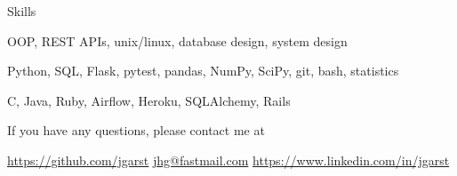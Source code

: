 \documentclass[11pt,a4paper]{article}
\begin{document}
\begin{mysection}{Skills}

    \begin{addmargin}[0.5em]{0em}

    \phantom{\large\bfseries Software Fundamentals: \quad}
     OOP, REST APIs, unix/linux, database design, system design
    \end{addmargin}

    \begin{addmargin}[0.5em]{0em}
        \phantom{\large\bfseries Software Fundamentals: \quad}
        Python, SQL, Flask, pytest, pandas, NumPy, SciPy, git, bash, statistics

    \end{addmargin}

    \begin{addmargin}[0.5em]{0em}

    \phantom{\large\bfseries Software Fundamentals: \quad}
    C, Java, Ruby, Airflow, Heroku, SQLAlchemy, Rails
    \end{addmargin}

\end{mysection}

\vfill

\begin{center}
    If you have any questions, please contact me at
\end{center}

\begin{center}
    \href{https://github.com/jgarst}{https://github.com/jgarst} 
    \textbullet{} 
    \href{jhg@fastmail.com}{jhg@fastmail.com}
    \textbullet{} 
    \href{https://www.linkedin.com/in/jgarst}
        {https://www.linkedin.com/in/jgarst}
\end{center}
\end{document}
